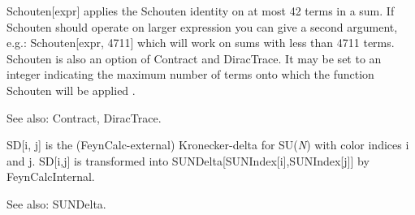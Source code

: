 



Schouten[expr] applies the Schouten identity on at most 42 terms in a sum. If Schouten should operate on larger expression you can give a
  second argument, e.g.: Schouten[expr, 4711] which will work on sums with less than 4711 terms.\\
Schouten is also an option of Contract and DiracTrace. It may be set to an integer indicating the maximum number of terms onto which the
  function Schouten will be applied .

See also: Contract, DiracTrace.









SD[i, j] is the (FeynCalc-external) Kronecker-delta for SU({\itshape N}) with color indices i and j. SD[i,j] is transformed into SUNDelta[SUNIndex[i],SUNIndex[j]]
by FeynCalcInternal.

See also:  SUNDelta.




